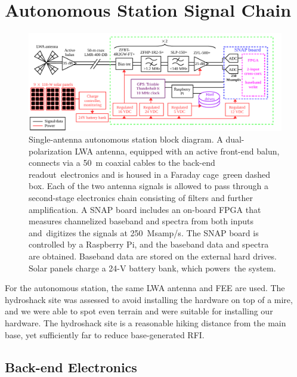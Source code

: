\section{Autonomous Station Signal Chain}

\begin{figure}
	\begin{center}
		\includegraphics[width=\linewidth]{Figures/albatros_single_schematic}
		\caption{Single-antenna autonomous station block diagram. A dual-polarization LWA antenna, equipped with an active front-end balun, connects via a \SI{50}{\meter} coaxial cables to the back-end readout electronics and is housed in a Faraday cage green dashed box. Each of the two antenna signals is allowed to pass through a second-stage electronics chain consisting of filters and further amplification. A SNAP board includes an on-board FPGA that measures channelized baseband and spectra from both inputs and digitizes the signals at 250~Msamp/s. The SNAP board is controlled by a Raspberry Pi, and the baseband data and spectra are obtained. Baseband data are stored on the external hard drives. Solar panels charge a 24-V battery bank, which powers the system.}
		\label{Fig:albatros1_schem}
	\end{center}
\end{figure}

For the autonomous station, the same LWA antenna and FEE are used. The hydroshack site was assessed to avoid installing the hardware on top of a mire, and we were able to spot even terrain and were suitable for installing our hardware. The hydroshack site is a reasonable hiking distance from the main base, yet sufficiently far to reduce base-generated RFI.

\subsection{Back-end Electronics} 

